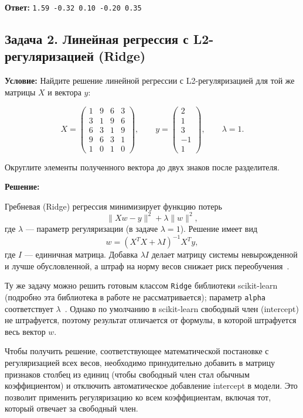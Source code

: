 \documentclass[pract]{SCWorks}
\begin{document}
\textbf{Ответ:} \texttt{1.59 -0.32 0.10 -0.20 0.35}

\subsection*{Задача 2. Линейная регрессия с L2-регуляризацией (Ridge)}

\textbf{Условие:} Найдите решение линейной регрессии с L2-регуляризацией для той же матрицы \(X\) и вектора \(y\):

\[
X = \begin{pmatrix}
1 & 9 & 6 & 3 \\
3 & 1 & 9 & 6 \\
6 & 3 & 1 & 9 \\
9 & 6 & 3 & 1 \\
1 & 0 & 1 & 0
\end{pmatrix}, \qquad 
y = \begin{pmatrix} 2 \\ 1 \\ 3 \\ -1 \\ 1 \end{pmatrix}, \qquad \lambda = 1.
\]

Округлите элементы полученного вектора до двух знаков после разделителя.

\textbf{Решение:}

Гребневая (Ridge) регрессия минимизирует функцию потерь
\[
\|X w - y\|^2 + \lambda \|w\|^2,
\]
где \(\lambda\) --- параметр регуляризации (в задаче \(\lambda = 1\)). Решение имеет вид
\[
w = (X^T X + \lambda I)^{-1} X^T y,
\]
где \(I\) --- единичная матрица. Добавка \(\lambda I\) делает матрицу системы невырожденной и лучше
обусловленной, а штраф на норму весов снижает риск переобучения~\cite{vanderplas}.

Ту же задачу можно решить готовым классом \texttt{Ridge} библиотеки scikit-learn (подробно эта библиотека в
работе не рассматривается); параметр \texttt{alpha} соответствует \(\lambda\)~\cite{sklearn-ridge}. Однако по умолчанию в
scikit-learn свободный член (intercept) не штрафуется, поэтому результат отличается от формулы, в которой
штрафуется весь вектор \(w\).

Чтобы получить решение, соответствующее математической постановке с регуляризацией всех весов, необходимо 
принудительно добавить в матрицу признаков столбец из единиц (чтобы свободный член стал обычным коэффициентом) 
и отключить автоматическое добавление intercept в модели. Это позволит применить регуляризацию ко всем 
коэффициентам, включая тот, который отвечает за свободный член.
\end{document}
